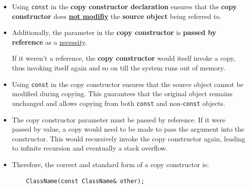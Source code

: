 \documentclass[10pt]{article}
\newcommand{\pbreak}{\vspace{30pt}}
\begin{document}
\begin{tcolorbox}
	\begin{itemize}
		\item Using \verb|const| in the \textbf{copy constructor declaration} ensures that the \textbf{copy constructor} does \underline{\textbf{not modifiy}} the \textbf{source object} being referred to.

		\item Additionally, the parameter in the \textbf{copy constructor} is \textbf{passed by reference} as a \underline{necessity}.

		If it weren't a reference, the \textbf{copy constructor} would itself invoke a copy, thus invoking itself again and so on till the system runs out of memory.

	\end{itemize}

	\pbreak

	\begin{itemize}
    \item Using \verb|const| in the copy constructor ensures that the source object cannot be modified during copying. This guarantees that the original object remains unchanged and allows copying from both \verb|const| and non-\verb|const| objects.

    \item The copy constructor parameter must be passed by reference. If it were passed by value, a copy would need to be made to pass the argument into the constructor. This would recursively invoke the copy constructor again, leading to infinite recursion and eventually a stack overflow.

    \item Therefore, the correct and standard form of a copy constructor is:
    \begin{verbatim}
    ClassName(const ClassName& other);
    \end{verbatim}
\end{itemize}
\end{tcolorbox}
\end{document}
